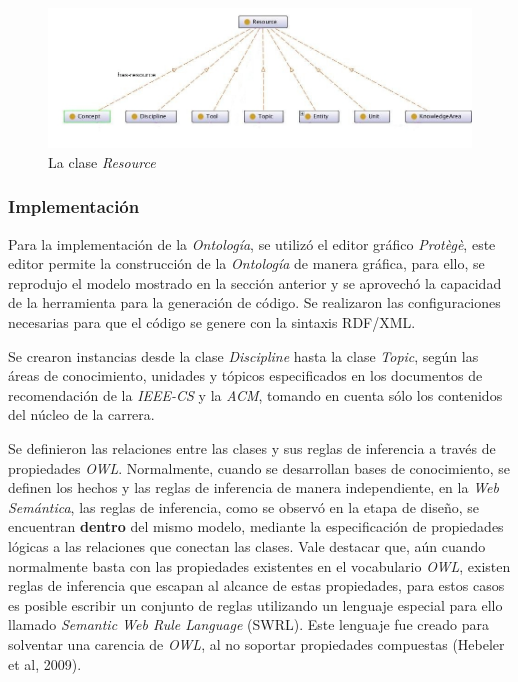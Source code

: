 \begin{itemize}
\newpage
\begin{figure}[!h]
    \begin{center}
        \includegraphics[scale=0.5]{images/onto_resource_class.jpg}
        \caption{La clase \textit{Resource}}
        \label{resourceClass}
    \end{center}
\end{figure}

\subsubsection{Implementación}
Para la implementación de la \textit{Ontología}, se utilizó el editor gráfico \textit{Protègè}, este editor permite la construcción de la \textit{Ontología} de manera gráfica, para ello, se reprodujo el modelo mostrado en la sección anterior y se aprovechó la capacidad de la herramienta para la generación de código. Se realizaron las configuraciones necesarias para que el código se genere con la sintaxis RDF/XML.

Se crearon instancias desde la clase \textit{Discipline} hasta la clase \textit{Topic}, según las áreas de conocimiento, unidades y tópicos especificados en los documentos de recomendación de la \textit{IEEE-CS} y la \textit{ACM}, tomando en cuenta sólo los contenidos del núcleo de la carrera.

Se definieron las relaciones entre las clases y sus reglas de inferencia a través de propiedades \textit{OWL}. Normalmente, cuando se desarrollan bases de conocimiento, se definen los hechos y las reglas de inferencia de manera independiente, en la \textit{Web Semántica}, las reglas de inferencia, como se observó en la etapa de diseño, se encuentran \textbf{dentro} del mismo modelo, mediante la especificación de propiedades lógicas a las relaciones que conectan las clases. Vale destacar que, aún cuando normalmente basta con las propiedades existentes en el vocabulario \textit{OWL}, existen reglas de inferencia que escapan al alcance de estas propiedades, para estos casos es posible escribir un conjunto de reglas utilizando un lenguaje especial para ello llamado \textit{Semantic Web Rule Language} (SWRL). Este lenguaje fue creado para solventar una carencia de \textit{OWL}, al no soportar propiedades compuestas (Hebeler et al, 2009).


\end{itemize}
